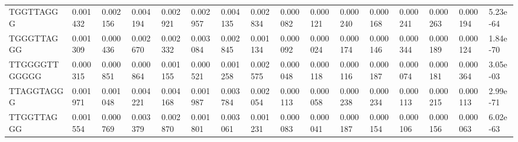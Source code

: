 \begin{samepage}
\begin{table}[h!]
\begin{tabular}{llllllllllllllll}
TGGTTAGGG       & 0.001432       & 0.002156       & 0.004194       & 0.002921       & 0.002957       & 0.004135       & 0.002834       & 0.000082       & 0.000121       & 0.000240       & 0.000168       & 0.000241       & 0.000263       & 0.000194       & 5.23e-64                           \\
TGGGTTAGGG      & 0.001309       & 0.000436       & 0.002670       & 0.002332       & 0.003084       & 0.002845       & 0.001134       & 0.000092       & 0.000024       & 0.000174       & 0.000146       & 0.000344       & 0.000189       & 0.000124       & 1.84e-70                           \\
TTGGGGTTGGGGG   & 0.000315       & 0.000851       & 0.000864       & 0.001155       & 0.000521       & 0.001258       & 0.002575       & 0.000048       & 0.000118       & 0.000116       & 0.000187       & 0.000074       & 0.000181       & 0.000364       & 3.05e-03                           \\
TTAGGTAGGG      & 0.001971       & 0.001048       & 0.004221       & 0.004168       & 0.001987       & 0.003784       & 0.002054       & 0.000113       & 0.000058       & 0.000238       & 0.000234       & 0.000113       & 0.000215       & 0.000113       & 2.99e-71                           \\
TTGGTTAGGG      & 0.001554       & 0.000769       & 0.003379       & 0.002870       & 0.001801       & 0.003061       & 0.001231       & 0.000083       & 0.000041       & 0.000187       & 0.000154       & 0.000106       & 0.000156       & 0.000063       & 6.02e-63                           \\
\hline
\end{tabular}
\caption{}
\label{}
\end{table}
\end{samepage}
